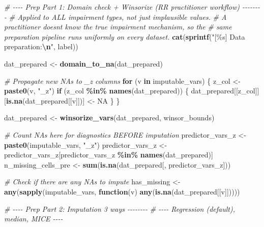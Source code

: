 \documentclass[
]{article}
\newenvironment{Shaded}{\begin{snugshade}}{\end{snugshade}}
\newcommand{\CommentTok}[1]{\textcolor[rgb]{0.56,0.35,0.01}{\textit{#1}}}
\newcommand{\ConstantTok}[1]{\textcolor[rgb]{0.56,0.35,0.01}{#1}}
\newcommand{\ControlFlowTok}[1]{\textcolor[rgb]{0.13,0.29,0.53}{\textbf{#1}}}
\newcommand{\FunctionTok}[1]{\textcolor[rgb]{0.13,0.29,0.53}{\textbf{#1}}}
\newcommand{\NormalTok}[1]{#1}
\newcommand{\OtherTok}[1]{\textcolor[rgb]{0.56,0.35,0.01}{#1}}
\newcommand{\SpecialCharTok}[1]{\textcolor[rgb]{0.81,0.36,0.00}{\textbf{#1}}}
\newcommand{\StringTok}[1]{\textcolor[rgb]{0.31,0.60,0.02}{#1}}
\begin{document}
\begin{Shaded}
\begin{Highlighting}[]
  \CommentTok{\# {-}{-}{-}{-} Prep Part 1: Domain check + Winsorize (RR practitioner workflow) {-}{-}{-}{-}{-}{-}{-}{-}}
  \CommentTok{\# Applied to ALL impairment types, not just implausible values.}
  \CommentTok{\# A practitioner doesn\textquotesingle{}t know the true impairment mechanism, so the}
  \CommentTok{\# same preparation pipeline runs uniformly on every dataset.}
  \FunctionTok{cat}\NormalTok{(}\FunctionTok{sprintf}\NormalTok{(}\StringTok{"[\%s] Data preparation:}\SpecialCharTok{\textbackslash{}n}\StringTok{"}\NormalTok{, label))}
  
\NormalTok{  dat\_prepared }\OtherTok{\textless{}{-}} \FunctionTok{domain\_to\_na}\NormalTok{(dat\_prepared)}
  
  \CommentTok{\# Propagate new NAs to \_z columns}
  \ControlFlowTok{for}\NormalTok{ (v }\ControlFlowTok{in}\NormalTok{ imputable\_vars) \{}
\NormalTok{    z\_col }\OtherTok{\textless{}{-}} \FunctionTok{paste0}\NormalTok{(v, }\StringTok{"\_z"}\NormalTok{)}
    \ControlFlowTok{if}\NormalTok{ (z\_col }\SpecialCharTok{\%in\%} \FunctionTok{names}\NormalTok{(dat\_prepared)) \{}
\NormalTok{      dat\_prepared[[z\_col]][}\FunctionTok{is.na}\NormalTok{(dat\_prepared[[v]])] }\OtherTok{\textless{}{-}} \ConstantTok{NA}
\NormalTok{    \}}
\NormalTok{  \}}
  
\NormalTok{  dat\_prepared }\OtherTok{\textless{}{-}} \FunctionTok{winsorize\_vars}\NormalTok{(dat\_prepared, winsor\_bounds)}
  
  \CommentTok{\# Count NAs here for diagnostics BEFORE imputation}
\NormalTok{  predictor\_vars\_z }\OtherTok{\textless{}{-}} \FunctionTok{paste0}\NormalTok{(imputable\_vars, }\StringTok{"\_z"}\NormalTok{)}
\NormalTok{  predictor\_vars\_z }\OtherTok{\textless{}{-}}\NormalTok{ predictor\_vars\_z[predictor\_vars\_z }\SpecialCharTok{\%in\%} \FunctionTok{names}\NormalTok{(dat\_prepared)]}
\NormalTok{  n\_missing\_cells\_pre }\OtherTok{\textless{}{-}} \FunctionTok{sum}\NormalTok{(}\FunctionTok{is.na}\NormalTok{(dat\_prepared[, predictor\_vars\_z]))}
  
  \CommentTok{\# Check if there are any NAs to impute}
\NormalTok{  has\_missing }\OtherTok{\textless{}{-}} \FunctionTok{any}\NormalTok{(}\FunctionTok{sapply}\NormalTok{(imputable\_vars, }\ControlFlowTok{function}\NormalTok{(v) }\FunctionTok{any}\NormalTok{(}\FunctionTok{is.na}\NormalTok{(dat\_prepared[[v]]))))}
  
  
  \CommentTok{\# {-}{-}{-}{-} Prep Part 2: Imputation 3 ways {-}{-}{-}{-}{-}{-}{-}{-}}
  \CommentTok{\# {-}{-}{-}{-} Regression (default), median, MICE {-}{-}{-}{-}}
  

\end{Highlighting}
\end{Shaded}
\end{document}

